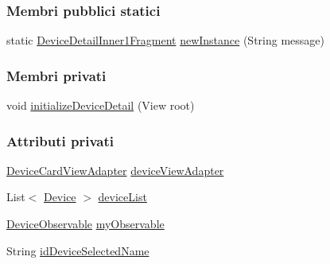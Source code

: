 \subsubsection*{Membri pubblici statici}
\begin{DoxyCompactItemize}
\item 
static \hyperlink{classit_1_1unibo_1_1torsello_1_1bluetoothpositioning_1_1fragment_1_1DeviceDetailInner1Fragment}{Device\+Detail\+Inner1\+Fragment} \hyperlink{classit_1_1unibo_1_1torsello_1_1bluetoothpositioning_1_1fragment_1_1DeviceDetailInner1Fragment_a24fbb536786e1e87e8621b126bd27507_a24fbb536786e1e87e8621b126bd27507}{new\+Instance} (String message)
\end{DoxyCompactItemize}
\subsubsection*{Membri privati}
\begin{DoxyCompactItemize}
\item 
void \hyperlink{classit_1_1unibo_1_1torsello_1_1bluetoothpositioning_1_1fragment_1_1DeviceDetailInner1Fragment_a1d1f9def45a374e0fd22bf443ff609a4_a1d1f9def45a374e0fd22bf443ff609a4}{initialize\+Device\+Detail} (View root)
\end{DoxyCompactItemize}
\subsubsection*{Attributi privati}
\begin{DoxyCompactItemize}
\item 
\hyperlink{classit_1_1unibo_1_1torsello_1_1bluetoothpositioning_1_1adapter_1_1DeviceCardViewAdapter}{Device\+Card\+View\+Adapter} \hyperlink{classit_1_1unibo_1_1torsello_1_1bluetoothpositioning_1_1fragment_1_1DeviceDetailInner1Fragment_ac96cc01fc4f531a4cb38a31cf56e81e9_ac96cc01fc4f531a4cb38a31cf56e81e9}{device\+View\+Adapter}
\item 
List$<$ \hyperlink{classit_1_1unibo_1_1torsello_1_1bluetoothpositioning_1_1model_1_1Device}{Device} $>$ \hyperlink{classit_1_1unibo_1_1torsello_1_1bluetoothpositioning_1_1fragment_1_1DeviceDetailInner1Fragment_a9e1211f228949b78f453eb9a65d93752_a9e1211f228949b78f453eb9a65d93752}{device\+List}
\item 
\hyperlink{classit_1_1unibo_1_1torsello_1_1bluetoothpositioning_1_1observables_1_1DeviceObservable}{Device\+Observable} \hyperlink{classit_1_1unibo_1_1torsello_1_1bluetoothpositioning_1_1fragment_1_1DeviceDetailInner1Fragment_a237134f174fd95371d0a7725b9a81183_a237134f174fd95371d0a7725b9a81183}{my\+Observable}
\item 
String \hyperlink{classit_1_1unibo_1_1torsello_1_1bluetoothpositioning_1_1fragment_1_1DeviceDetailInner1Fragment_a15c5b5dd3b89ff572fb25b5825ef6fdf_a15c5b5dd3b89ff572fb25b5825ef6fdf}{id\+Device\+Selected\+Name}
\end{DoxyCompactItemize}
